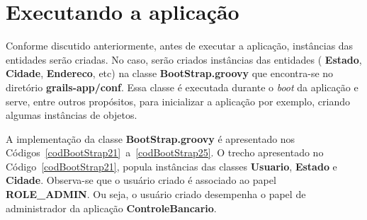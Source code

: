 \section{Executando a aplicação}\label{secBootstrap2}

\vspace{0.3cm}

Conforme discutido anteriormente, antes  de executar a aplicação, instâncias das
entidades serão criadas.  No caso,  serão criados instâncias das entidades ({\bf
  Estado}, {\bf  Cidade}, {\bf Endereco}, etc) na  classe {\bf BootStrap.groovy}
que  encontra-se no  diretório {\bf  grails-app/conf}. Essa  classe  é executada
durante  o  {\it boot}  da  aplicação e  serve,  entre  outros propósitos,  para
inicializar a aplicação por exemplo, criando algumas instâncias de objetos. 

A   implementação   da  classe   {\bf   BootStrap.groovy}   é  apresentado   nos
Códigos~\ref{codBootStrap21}~a~\ref{codBootStrap25}.   O  trecho apresentado  no
Código~\ref{codBootStrap21},  popula  instâncias   das  classes  {\bf  Usuario},
{\bf Estado}  e {\bf  Cidade}. Observa-se  que o usuário  criado é  associado ao
papel  {\bf  ROLE\_ADMIN}. Ou  seja,  o usuário  criado  desempenha  o papel  de
administrador da aplicação {\bf ControleBancario}.  

